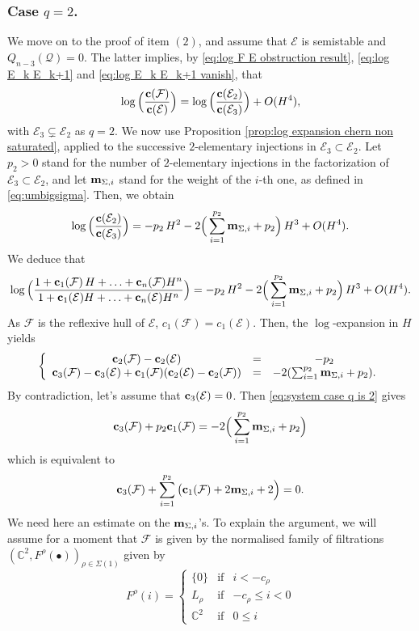 \documentclass[a4paper,10pt]{amsart}
\theoremstyle{plain}{
    \newtheorem{theorem}{Theorem}[section]
    \newtheorem{lemma}[theorem]{Lemma}
    \newtheorem{corollary}[theorem]{Corollary}
    \newtheorem{proposition}[theorem]{Proposition}
    \newtheorem{conjecture}[theorem]{Conjecture}
}
\theoremstyle{definition}{
    \newtheorem{definition}[theorem]{Definition}
    \newtheorem{defn-thm}[theorem]{Definition-Theorem}
    \newtheorem{example}[theorem]{Example}
    \newtheorem{notation}[theorem]{Notation}
}
\theoremstyle{remark}{
    \newtheorem{remark}[theorem]{Remark}
    \newtheorem{problem}[theorem]{Problem}
    \newtheorem{question}[theorem]{Question}
}
\def\um{{\bf m}}
\def\uc{{\bf c}}
\def\cF{\mathcal{F}}
\def\cE{\mathcal{E}}
\def\cQ{\mathcal{Q}}
\def\C{\mathbb{C}}
\begin{document}
\subsubsection{Case $q=2$.} We move on to the proof of item $(2)$, and assume that $\cE$ is semistable and $Q_{n-3}(\cQ)=0$. The latter implies,  by \eqref{eq:log F E obstruction result}, \eqref{eq:log E_k E_k+1} and \eqref{eq:log E_k E_k+1 vanish}, that
$$
\log\Big(\frac{\uc(\cF)}{\uc(\cE)} \Big)=\log\Big(\frac{\uc(\cE_{2})}{\uc(\cE_{3})} \Big)+O(H^4),
$$
with $\cE_3\subsetneq \cE_2$ as $q=2$. We now use Proposition \ref{prop:log expansion chern non saturated}, applied to the successive $2$-elementary injections in $\cE_3\subset\cE_2$. Let $p_2>0$ stand for the number of $2$-elementary injections in the factorization of $\cE_3\subset\cE_2$, and let $\um_{\Sigma,i}$ stand for the weight of the $i$-th one, as defined in \eqref{eq:umbigsigma}. Then, we obtain
$$
\log\Big(\frac{\uc(\cE_2)}{\uc(\cE_3)} \Big)=-p_2\,H^2-2\Big(\sum_{i=1}^{p_2}\um_{\Sigma,i}+p_2\Big)\,H^3+O(H^4).
$$
We deduce that
$$
\displaystyle\log\Big(\frac{1+\uc_1(\cF) \,H+\ldots+\uc_n(\cF)H^n}{1+\uc_1(\cE) H+\ldots +\uc_n(\cE) H^n}\Big)=-p_2\,H^2-2\Big(\sum_{i=1}^{p_2}\um_{\Sigma,i}+p_2\Big)\,H^3+O(H^4).
$$
As $\cF$ is the reflexive hull of $\cE$, $c_1(\cF)=c_1(\cE)$. Then, the $\log$-expansion in $H$ yields
\begin{equation}
\label{eq:system case q is 2}
 \left\{ 
 \begin{array}{ccc}
 \uc_2(\cF)-\uc_2(\cE)  &= & -p_2 \\
\uc_3(\cF)-\uc_3(\cE)+\uc_1(\cF)(\uc_2(\cE)-\uc_2(\cF)) &=   & -2(\sum_{i=1}^{p_2}\um_{\Sigma,i}+p_2).
 \end{array}
 \right.
\end{equation}
By contradiction, let's assume that $\uc_3(\cE)=0$. Then \eqref{eq:system case q is 2} gives
$$
\uc_3(\cF)+p_2\uc_1(\cF) =   -2\Big(\sum_{i=1}^{p_2}\um_{\Sigma,i}+p_2\Big)
$$
which is equivalent to
\begin{equation}
 \label{eq:the equality q is 2 case}
 \uc_3(\cF)+\sum_{i=1}^{p_2}\big(\uc_1(\cF)+2\um_{\Sigma,i}+2\Big) =   0.
\end{equation}
We need here an estimate on the $\um_{\Sigma,i}$'s. To explain the argument, we will assume for a moment that 
$\cF$ is given by the normalised family of filtrations $(\C^2,F^\rho(\bullet))_{\rho\in\Sigma(1)}$ given  by 
 \begin{equation}
  \label{eq:starting sheaf case q is 2}
 F^\rho(i)=\left\{
 \begin{array}{ccc}
                  \lbrace 0 \rbrace & \mathrm{ if } & i< -c_\rho \\
                 L_\rho & \mathrm{ if } & -c_\rho\leq i< 0 \\
\C^2 & \mathrm{ if } & 0\leq i 
                  \end{array}
                  \right.
 \end{equation}
\end{document}
